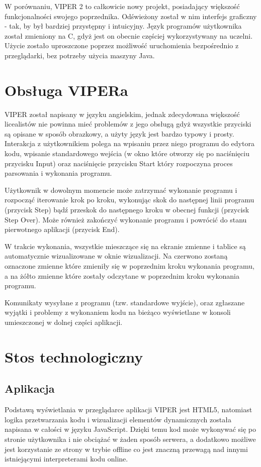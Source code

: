 \documentclass[a4paper,twoside,openright,11pt]{report}
\begin{document}
\par W porównaniu, VIPER 2 to całkowicie nowy projekt, posiadający większość funkcjonalności swojego poprzednika. Odświeżony został w nim interfejs graficzny - tak, by był bardziej przystępny i intuicyjny. Język programów użytkownika został zmieniony na C, gdyż jest on obecnie częściej wykorzystywany na uczelni. Użycie zostało uproszczone poprzez możliwość uruchomienia bezpośrednio z przeglądarki, bez potrzeby użycia maszyny Java.

  \chapter{Obsługa VIPERa}
\par VIPER został napisany w języku angielskim, jednak zdecydowana większość licealistów nie powinna mieć problemów z jego obsługą gdyż wszystkie przyciski są opisane w sposób obrazkowy, a użyty język jest bardzo typowy i prosty. Interakcja z użytkownikiem polega na wpisaniu przez niego programu do edytora kodu, wpisanie standardowego wejścia (w okno które otworzy się po naciśnięciu przycisku Input) oraz naciśnięcie przycisku Start który rozpoczyna proces parsowania i wykonania programu. 
\par Użytkownik w dowolnym momencie może zatrzymać wykonanie programu i rozpocząć iterowanie krok po kroku, wykonując skok do następnej linii programu (przycisk Step) bądź przeskok do następnego kroku w obecnej funkcji (przycisk Step Over). Może również zakończyć wykonanie programu i powrócić do stanu pierwotnego aplikacji (przycisk End).
\par W trakcie wykonania, wszystkie mieszczące się na ekranie zmienne i tablice są automatycznie wizualizowane w oknie wizualizacji. Na czerwono zostaną oznaczone zmienne które zmieniły się w poprzednim kroku wykonania programu, a na żółto zmienne które zostały odczytane w poprzednim kroku wykonania programu. 
\par Komunikaty wysyłane z programu (tzw. standardowe wyjście), oraz zgłaszane wyjątki i problemy z wykonaniem kodu na bieżąco wyświetlane w konsoli umieszczonej w dolnej części aplikacji. 

  \chapter{Stos technologiczny}

  \section{Aplikacja}
\par Podstawą wyświetlania w przeglądarce aplikacji VIPER jest HTML5, natomiast logika przetwarzania kodu i wizualizacji elementów dynamicznych została napisana w całości w języku JavaScript. Dzięki temu kod może wykonywać się po stronie użytkownika i nie obciążać w żaden sposób serwera, a dodatkowo możliwe jest korzystanie ze strony w trybie offline co jest znaczną przewagą nad innymi istniejącymi interpreterami kodu online.
\end{document}
